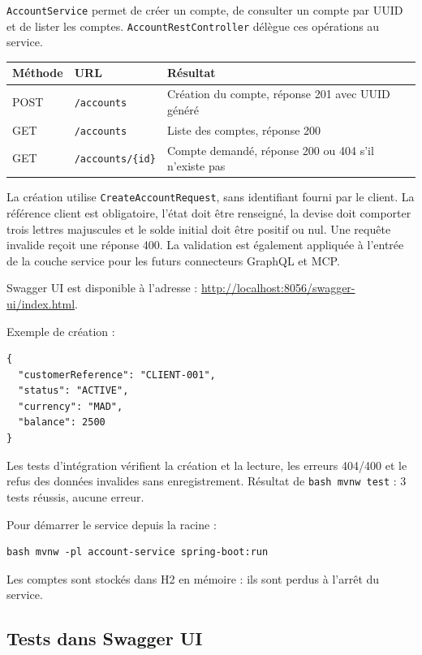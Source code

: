 \documentclass[11pt,a4paper]{report}
\begin{document}
\nolinkurl{AccountService} permet de créer un compte, de consulter un compte par UUID et de lister les comptes. \nolinkurl{AccountRestController} délègue ces opérations au service.

\begin{table}[H]\centering\small
\begin{tabularx}{\linewidth}{XXX}\toprule
Méthode & URL & Résultat\\
\midrule
POST & \nolinkurl{/accounts} & Création du compte, réponse 201 avec UUID généré\\
GET & \nolinkurl{/accounts} & Liste des comptes, réponse 200\\
GET & \nolinkurl{/accounts/{id}} & Compte demandé, réponse 200 ou 404 s'il n'existe pas\\
\bottomrule\end{tabularx}
\end{table}

La création utilise \nolinkurl{CreateAccountRequest}, sans identifiant fourni par le client. La référence client est obligatoire, l'état doit être renseigné, la devise doit comporter trois lettres majuscules et le solde initial doit être positif ou nul. Une requête invalide reçoit une réponse 400. La validation est également appliquée à l'entrée de la couche service pour les futurs connecteurs GraphQL et MCP.

Swagger UI est disponible à l'adresse : \url{http://localhost:8056/swagger-ui/index.html}.

Exemple de création :

\begin{lstlisting}
{
  "customerReference": "CLIENT-001",
  "status": "ACTIVE",
  "currency": "MAD",
  "balance": 2500
}
\end{lstlisting}

Les tests d'intégration vérifient la création et la lecture, les erreurs 404/400 et le refus des données invalides sans enregistrement. Résultat de \nolinkurl{bash mvnw test} : 3 tests réussis, aucune erreur.

Pour démarrer le service depuis la racine :

\begin{lstlisting}
bash mvnw -pl account-service spring-boot:run
\end{lstlisting}

Les comptes sont stockés dans H2 en mémoire : ils sont perdus à l'arrêt du service.

\subsection{Tests dans Swagger UI}
\end{document}
